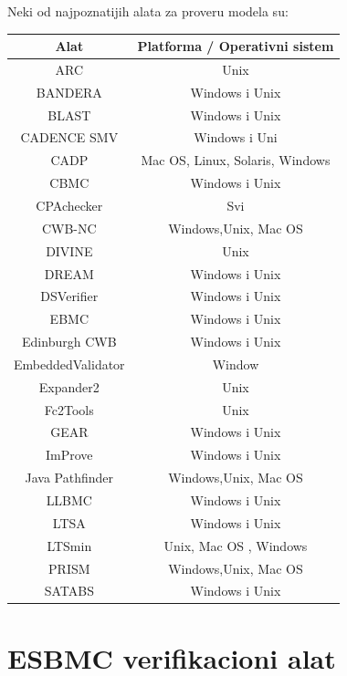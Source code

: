 \documentclass[a4paper]{article}
\begin{document}
{Neki od najpoznatijih alata za proveru modela su:

\begin{center}
 \begin{tabular}{||c c||} 
 \hline
 \textbf{Alat}  & \textbf{Platforma / Operativni sistem} \\ [0.5ex] 
 \hline\hline
 ARC & Unix \\ 
 \hline
 BANDERA & Windows i Unix  \\
 \hline
 BLAST  & Windows i Unix  \\
 \hline
 CADENCE SMV & Windows i Uni  \\
 \hline
 CADP & Mac OS, Linux, Solaris, Windows  \\
  \hline
 CBMC & Windows i Unix \\ 
  \hline
 CPAchecker & Svi \\ 
  \hline
 CWB-NC & Windows,Unix, Mac OS \\ 
  \hline
 DIVINE & Unix \\ 
  \hline
 DREAM & Windows i Unix \\ 
  \hline
 DSVerifier & Windows i Unix \\ 
   \hline
 EBMC & Windows i Unix \\ 
   \hline
 Edinburgh CWB & Windows i Unix \\ 
   \hline
 EmbeddedValidator & Window \\ 
   \hline
 Expander2 & Unix \\ 
   \hline
 Fc2Tools &  Unix \\ 
   \hline
 GEAR & Windows i Unix \\ 
   \hline
 ImProve & Windows i Unix \\ 
   \hline
 Java Pathfinder &  Windows,Unix, Mac OS \\ 
   \hline
 LLBMC & Windows i Unix \\ 
    \hline
 LTSA & Windows i Unix \\ 
     \hline
 LTSmin & Unix, Mac OS , Windows \\
    \hline
 PRISM &  Windows,Unix, Mac OS \\
   \hline
 SATABS &  Windows i Unix \\ [1ex]

 
 
 \hline
\end{tabular}
\end{center}
\cite{wikiwebsite}
	\section{ESBMC verifikacioni alat}
	\label{sec:ESBMC}

}
\end{document}
